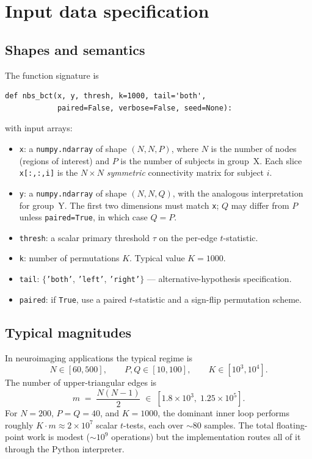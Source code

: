 \documentclass[11pt]{article}
\begin{document}
\section{Input data specification}

\subsection{Shapes and semantics}

The function signature is
%
\begin{lstlisting}
def nbs_bct(x, y, thresh, k=1000, tail='both',
            paired=False, verbose=False, seed=None):
\end{lstlisting}
%
with input arrays:

\begin{itemize}[leftmargin=2.0em]
\item \texttt{x}: a \texttt{numpy.ndarray} of shape $(N, N, P)$, where $N$ is the number of nodes (regions of interest) and $P$ is the number of subjects in group~X. Each slice \texttt{x[:,:,i]} is the $N\times N$ \emph{symmetric} connectivity matrix for subject $i$.
\item \texttt{y}: a \texttt{numpy.ndarray} of shape $(N, N, Q)$, with the analogous interpretation for group~Y. The first two dimensions must match \texttt{x}; $Q$ may differ from $P$ unless \texttt{paired=True}, in which case $Q=P$.
\item \texttt{thresh}: a scalar primary threshold $\tau$ on the per-edge $t$-statistic.
\item \texttt{k}: number of permutations $K$. Typical value $K=1000$.
\item \texttt{tail}: $\{$\texttt{'both'}, \texttt{'left'}, \texttt{'right'}$\}$ --- alternative-hypothesis specification.
\item \texttt{paired}: if \texttt{True}, use a paired $t$-statistic and a sign-flip permutation scheme.
\end{itemize}

\subsection{Typical magnitudes}

In neuroimaging applications the typical regime is
%
\[
N \in [60, 500], \qquad P, Q \in [10, 100], \qquad K \in [10^3, 10^4].
\]
%
The number of upper-triangular edges is
%
\[
m \;=\; \frac{N(N-1)}{2} \;\in\; [1.8\times10^3,\; 1.25\times10^5].
\]
%
For $N=200$, $P=Q=40$, and $K=1000$, the dominant inner loop performs roughly $K \cdot m \approx 2\times10^7$ scalar $t$-tests, each over $\sim 80$ samples. The total floating-point work is modest ($\sim 10^9$ operations) but the implementation routes all of it through the Python interpreter.
\end{document}
